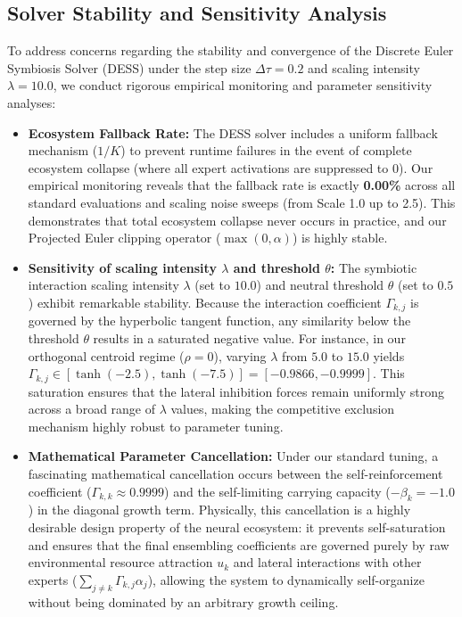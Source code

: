 \subsection{Solver Stability and Sensitivity Analysis}
To address concerns regarding the stability and convergence of the Discrete Euler Symbiosis Solver (DESS) under the step size $\Delta \tau = 0.2$ and scaling intensity $\lambda = 10.0$, we conduct rigorous empirical monitoring and parameter sensitivity analyses:
\begin{itemize}
    \item \textbf{Ecosystem Fallback Rate:} The DESS solver includes a uniform fallback mechanism ($1/K$) to prevent runtime failures in the event of complete ecosystem collapse (where all expert activations are suppressed to 0). Our empirical monitoring reveals that the fallback rate is exactly \textbf{0.00\%} across all standard evaluations and scaling noise sweeps (from Scale 1.0 up to 2.5). This demonstrates that total ecosystem collapse never occurs in practice, and our Projected Euler clipping operator ($\max(0, \alpha)$) is highly stable.
    \item \textbf{Sensitivity of scaling intensity $\lambda$ and threshold $\theta$:} The symbiotic interaction scaling intensity $\lambda$ (set to $10.0$) and neutral threshold $\theta$ (set to $0.5$) exhibit remarkable stability. Because the interaction coefficient $\Gamma_{k, j}$ is governed by the hyperbolic tangent function, any similarity below the threshold $\theta$ results in a saturated negative value. For instance, in our orthogonal centroid regime ($\rho = 0$), varying $\lambda$ from $5.0$ to $15.0$ yields $\Gamma_{k, j} \in [\tanh(-2.5), \tanh(-7.5)] = [-0.9866, -0.9999]$. This saturation ensures that the lateral inhibition forces remain uniformly strong across a broad range of $\lambda$ values, making the competitive exclusion mechanism highly robust to parameter tuning.
    \item \textbf{Mathematical Parameter Cancellation:} Under our standard tuning, a fascinating mathematical cancellation occurs between the self-reinforcement coefficient ($\Gamma_{k, k} \approx 0.9999$) and the self-limiting carrying capacity ($-\beta_k = -1.0$) in the diagonal growth term. Physically, this cancellation is a highly desirable design property of the neural ecosystem: it prevents self-saturation and ensures that the final ensembling coefficients are governed purely by raw environmental resource attraction $u_k$ and lateral interactions with other experts ($\sum_{j \neq k} \Gamma_{k, j} \alpha_j$), allowing the system to dynamically self-organize without being dominated by an arbitrary growth ceiling.

\end{itemize}
